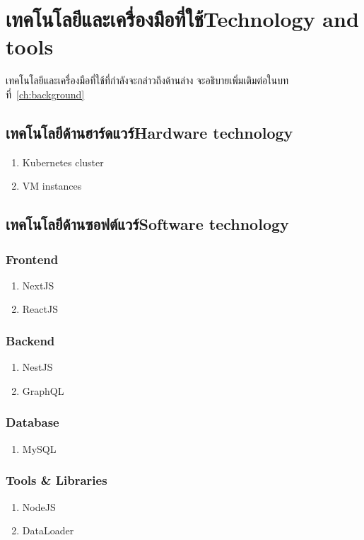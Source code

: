 \section{\ifcpe เทคโนโลยีและเครื่องมือที่ใช้\else Technology and tools\fi}

เทคโนโลยีและเครื่องมือที่ใช้ที่กำลังจะกล่าวถึงด้านล่าง จะอธิบายเพิ่มเติมต่อในบทที่~\ref{ch:background}

\subsection{\ifcpe เทคโนโลยีด้านฮาร์ดแวร์\else Hardware technology\fi}
\begin{enumerate}
    \item Kubernetes cluster
    \item VM instances
\end{enumerate}

\subsection{\ifcpe เทคโนโลยีด้านซอฟต์แวร์\else Software technology\fi}
\subsubsection{Frontend}
\begin{enumerate}
    \item NextJS \cite{nextjs}
    \item ReactJS \cite{reactjs}
\end{enumerate}

\subsubsection{Backend}
\begin{enumerate}
    \item NestJS \cite {nestjs}
    \item GraphQL \cite {graphql}
\end{enumerate}

\subsubsection{Database}
\begin{enumerate}
    \item MySQL \cite {mysql}
\end{enumerate}

\subsubsection{Tools \& Libraries}
\begin{enumerate}
    \item NodeJS \cite {nodejs}
    \item DataLoader \cite {dataloader}
\end{enumerate}

